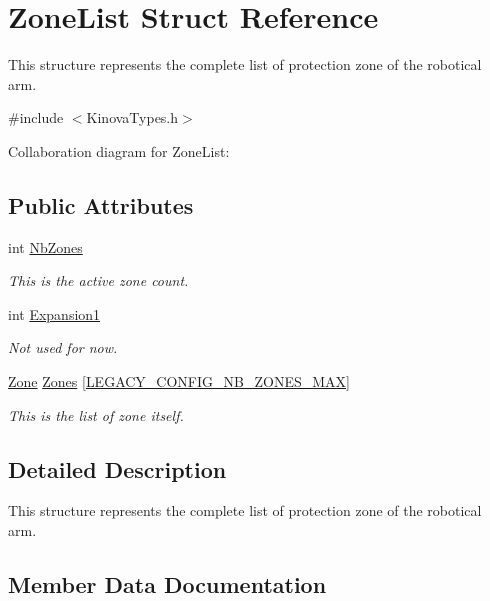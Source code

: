 \hypertarget{struct_zone_list}{}\section{Zone\+List Struct Reference}
\label{struct_zone_list}


This structure represents the complete list of protection zone of the robotical arm.  




{\ttfamily \#include $<$Kinova\+Types.\+h$>$}



Collaboration diagram for Zone\+List\+:
\subsection*{Public Attributes}
\begin{DoxyCompactItemize}
\item 
int \hyperlink{struct_zone_list_a57c3da2ad7f954ad2c1171e435260716}{Nb\+Zones}
\begin{DoxyCompactList}\small\item\em This is the active zone count. \end{DoxyCompactList}\item 
int \hyperlink{struct_zone_list_ab9e944f94ed520a133bbb7c3bf08f55d}{Expansion1}
\begin{DoxyCompactList}\small\item\em Not used for now. \end{DoxyCompactList}\item 
\hyperlink{struct_zone}{Zone} \hyperlink{struct_zone_list_aeabee24f26e18a9091b22593597a6132}{Zones} \mbox{[}\hyperlink{_kinova_types_8h_a1c024cb33df9cadef7058df1e6bf8095}{L\+E\+G\+A\+C\+Y\+\_\+\+C\+O\+N\+F\+I\+G\+\_\+\+N\+B\+\_\+\+Z\+O\+N\+E\+S\+\_\+\+M\+AX}\mbox{]}
\begin{DoxyCompactList}\small\item\em This is the list of zone itself. \end{DoxyCompactList}\end{DoxyCompactItemize}


\subsection{Detailed Description}
This structure represents the complete list of protection zone of the robotical arm. 

\subsection{Member Data Documentation}
